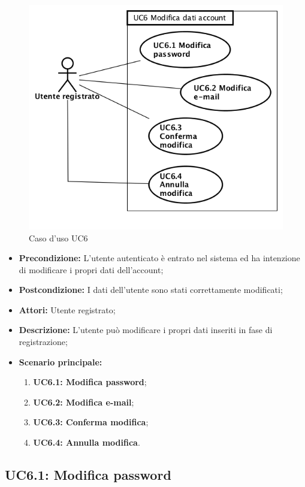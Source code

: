 \begin{figure}[h]
	\begin{center}
	\includegraphics[scale=0.4]{diagram/UC6.png}
	\caption{Caso d'uso UC6}
	\end{center}
\end{figure}
\begin{itemize}
	\item \textbf{Precondizione:} L’utente autenticato è entrato nel sistema ed ha intenzione di modificare i propri dati dell’account;
	\item \textbf{Postcondizione:} I dati dell’utente sono stati correttamente modificati;
	\item \textbf{Attori:} Utente registrato;
	\item \textbf{Descrizione:} L’utente può modificare i propri dati inseriti in fase di registrazione;
	\item \textbf{Scenario principale:}
	\begin{enumerate}
		\item \textbf{ UC6.1: Modifica password};
		\item \textbf{ UC6.2: Modifica e-mail};
		\item \textbf{ UC6.3: Conferma modifica};
		\item \textbf{ UC6.4: Annulla modifica}.
	\end{enumerate}
\end{itemize}
\subsection{ UC6.1: Modifica password}


